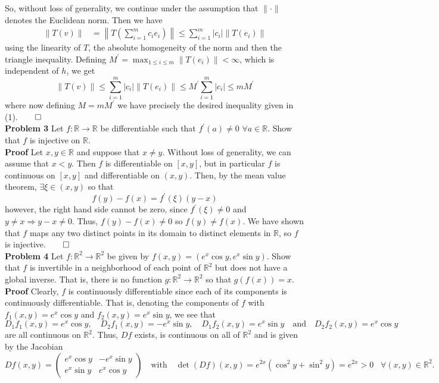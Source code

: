\documentclass[11pt, letterpaper]{article}
\newcommand{\mbb}[1]{\mathbb{#1}}
\begin{document}
    So, without loss of generality, we continue under the assumption that $\|\cdot\|$ denotes the Euclidean norm. Then we have
    \begin{align*}
        \|T(v)\|&=\left\|T\left(\sum_{i=1}^mc_ie_i\right)\right\|\leq\sum_{i=1}^m|c_i|\|T(e_i)\|
    \end{align*}
    using the linearity of $T$, the absolute homogeneity of the norm and then the triangle inequality. Defining $M^\prime=\max_{1\leq i\leq m}\|T(e_i)\|<\infty$, which is independent of $h$, we get
    \[\|T(v)\|\leq\sum_{i=1}^m|c_i|\|T(e_i)\|\leq M^\prime\sum_{i=1}^m|c_i|\leq mM^\prime\]
    where now defining $M=mM^\prime$ we have precisely the desired inequality given in (1).\hfill{$\qed$}\\[10pt]
    {\bf Problem 3} Let $f:\mbb{R}\rightarrow\mbb{R}$ be differentiable such that $f^\prime(a)\neq 0$ $\forall a\in\mbb{R}$. Show that $f$ is injective on $\mbb{R}$.\\[10pt]
    {\bf Proof} Let $x,y\in\mbb{R}$ and suppose that $x\neq y$. Without loss of generality, we can assume that $x<y$. Then $f$ is differentiable on $[x,y]$, but in particular $f$ is
    continuous on $[x,y]$ and differentiable on $(x,y)$. Then, by the mean value theorem, $\exists\xi\in(x,y)$ so that
    \[f(y) - f(x)=f^\prime(\xi)(y-x)\]
    however, the right hand side cannot be zero, since $f^\prime(\xi)\neq 0$ and $y\neq x\Rightarrow y-x\neq 0$. Thus, $f(y)-f(x)\neq 0$ so $f(y)\neq f(x)$. We have
    shown that $f$ maps any two distinct points in its domain to distinct elements in $\mbb{R}$, so $f$ is injective.\hfill{$\qed$}\\[10pt]
    {\bf Problem 4} Let $f:\mbb{R}^2\rightarrow\mbb{R}^2$ be given by $f(x,y)=(e^x\cos y,e^x\sin y)$. Show that $f$ is invertible in a neighborhood of each point of $\mbb{R}^2$ but does not have a
    global inverse. That is, there is no function $g:\mbb{R}^2\rightarrow\mbb{R}^2$ so that $g(f(x))=x$.\\[10pt]
    {\bf Proof} Clearly, $f$ is continuously differentiable since each of its components is continuously differentiable. That is, denoting the components of $f$ with $f_1(x,y)=e^x\cos y$ and $f_2(x,y)=e^x\sin y$, we see that
    \[D_1f_1(x,y)=e^x\cos y,\quad D_2f_1(x,y)=-e^x\sin y,\quad D_1f_2(x,y)=e^x\sin y\quad\text{and}\quad D_2f_2(x,y)=e^x\cos y\]
    are all continuous on $\mbb{R}^2$. Thus, $Df$ exists, is continuous on all of $\mbb{R}^2$ and is given by the Jacobian
    \[Df(x,y)=\begin{pmatrix}
        e^x\cos y & -e^x\sin y\\
        e^x\sin y & e^x\cos y
    \end{pmatrix}\quad\text{with}\quad \det(Df)(x,y)=e^{2x}(\cos^2y+\sin^2y)=e^{2x}>0\;\;\;\forall (x,y)\in\mbb{R}^2.\]
\end{document}
